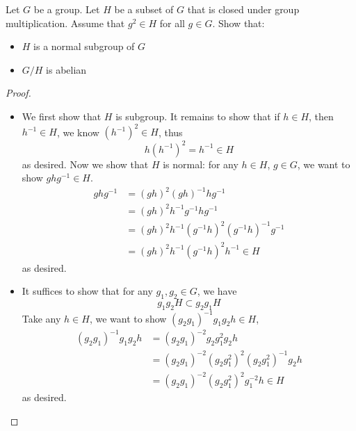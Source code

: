\begin{prob}[F2010-Q1]
    Let \( G \) be a group. Let \( H \) be a subset of \( G \) that is closed under group multiplication. Assume that \( g^2 \in H \) for all \( g \in G \). Show that:
    \begin{itemize}
        \item \( H \) is a normal subgroup of \( G \)
        \item \( G/H \) is abelian
    \end{itemize}
\end{prob}
\begin{proof}
    \begin{itemize}
        \item We first show that $H$ is subgroup. It remains to show that if $h\in H$, then $h^{-1}\in H$, we know $(h^{-1})^2\in H$, thus 
        \begin{equation*}
            h(h^{-1})^2=h^{-1}\in H
        \end{equation*}
        as desired.  Now we show that $H$ is normal: for any $h\in H$, $g\in G$, we want to show $ghg^{-1}\in H$.
        \begin{align*}
            ghg^{-1}&=(gh)^2(gh)^{-1}hg^{-1}\\
            &=(gh)^2h^{-1}g^{-1}hg^{-1}\\
            &=(gh)^2h^{-1}(g^{-1}h)^2(g^{-1}h)^{-1}g^{-1}\\
            &=(gh)^2h^{-1}(g^{-1}h)^2h^{-1}\in H
        \end{align*}
        as desired.
        \item It suffices to show that for any $g_1,g_2\in G$, we have 
        \begin{equation*}
            g_1g_2H\subset g_2g_1H
        \end{equation*}
        Take any $h\in H$, we want to show $(g_2g_1)^{-1}g_1g_2h\in H$,
        \begin{align*}
            (g_2g_1)^{-1}g_1g_2h&=(g_2g_1)^{-2}g_2g_1^2g_2h\\
            &=(g_2g_1)^{-2}(g_2g_1^2)^2(g_2g_1^2)^{-1}g_2h\\
            &=(g_2g_1)^{-2}(g_2g_1^2)^2g_1^{-2}h\in H
        \end{align*}
        as desired.
    \end{itemize}
\end{proof}

